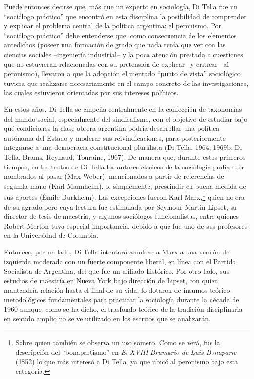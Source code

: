 Puede entonces decirse que, más que un experto en sociología, Di Tella fue un \enquote{sociólogo práctico} que encontró en esta disciplina la posibilidad de comprender y explicar el problema central de la política argentina: el peronismo. Por \enquote{sociólogo práctico} debe entenderse que, como consecuencia de los elementos antedichos (poseer una formación de grado que nada tenía que ver con las ciencias sociales --ingeniería industrial-- y la poca atención prestada a cuestiones que no estuvieran relacionadas con su pretensión de explicar --y criticar-- al peronismo), llevaron a que la adopción el mentado \enquote{punto de vista} sociológico tuviera que realizarse necesariamente en el campo concreto de las investigaciones, las cuales estuvieron orientadas por sus intereses políticos.

En estos años, Di Tella se empeña centralmente en la confección de taxonomías del mundo social, especialmente del sindicalismo, con el objetivo de estudiar bajo qué condiciones la clase obrera argentina podría desarrollar una política autónoma del Estado y moderar sus reivindicaciones, para posteriormente integrarse a una democracia constitucional pluralista (Di Tella, 1964; 1969b; Di Tella, Brams, Reynaud, Touraine, 1967). De manera que, durante estos primeros tiempos, en los textos de Di Tella los autores clásicos de la sociología podían ser nombrados al pasar (Max Weber), mencionados a partir de referencias de segunda mano (Karl Mannheim), o, simplemente, prescindir en buena medida de sus aportes (Émile Durkheim). Las excepciones fueron Karl Marx,\footnote{Sobre quien también se observa un uso somero. Como se verá, fue la descripción del \enquote{bonapartismo} en \emph{El XVIII Brumario de Luis Bonaparte} (1852) lo que más interesó a Di Tella, ya que ubicó al peronismo bajo esta categoría.} quien no era de su agrado pero cuya lectura fue estimulada por Seymour Martin Lipset, su director de tesis de maestría, y algunos sociólogos funcionalistas, entre quienes Robert Merton tuvo especial importancia, debido a que fue uno de sus profesores en la Universidad de Columbia.

Entonces, por un lado, Di Tella intentará amoldar a Marx a una versión de izquierda moderada con un fuerte componente liberal, en línea con el Partido Socialista de Argentina, del que fue un afiliado histórico. Por otro lado, sus estudios de maestría en Nueva York bajo dirección de Lipset, con quien mantendría relación hasta el final de su vida, lo dotaron de insumos teórico-metodológicos fundamentales para practicar la sociología durante la década de 1960 aunque, como se ha dicho, el trasfondo teórico de la tradición disciplinaria en sentido amplio no se ve utilizado en los escritos que se analizarán.

